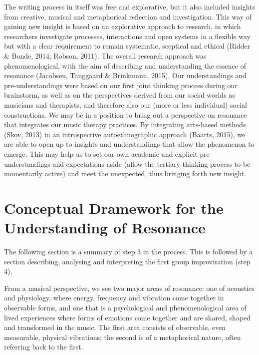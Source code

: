\begin{adjmulticols}{2}{0mm}{0mm}
The writing process in itself was free and explorative, but it also included insights from creative, musical and metaphorical reflection and investigation. This way of gaining new insight is based on an explorative approach to research, in which researchers investigate processes, interactions and open systems in a flexible way but with a clear requirement to remain systematic, sceptical and ethical (Ridder \& Bonde, 2014; Robson, 2011). The overall research approach was phenomenological, with the aim of describing and understanding the essence of resonance (Jacobsen, Tanggaard \& Brinkmann, 2015). Our understandings and pre-understandings were based on our first joint thinking process during our brainstorm, as well as on the perspectives derived from our social worlds as musicians and therapists, and therefore also our (more or less individual) social constructions. We may be in a position to bring out a perspective on resonance that integrates our music therapy practices. By integrating arts-based methods (Skov, 2013) in an introspective autoethnographic approach (Baarts, 2015), we are able to open up to insights and understandings that allow the phenomenon to emerge. This may help us to set our own academic and explicit pre-understandings and expectations aside (allow the tertiary thinking process to be momentarily active) and meet the unexpected, thus bringing forth new insight. 

\section{Conceptual Dramework for the Understanding of Resonance}
The following section is a summary of step 3 in the process. This is followed by a section describing, analysing and interpreting the first group improvisation (step 4). 

From a musical perspective, we see two major areas of resonance: one of acoustics and physiology, where energy, frequency and vibration come together in observable forms, and one that is a psychological and phenomenological area of lived experiences where forms of emotions come together and are shared, shaped and transformed in the music. The first area consists of observable, even measurable, physical vibrations; the second is of a metaphorical nature, often referring back to the first.


\end{adjmulticols}
